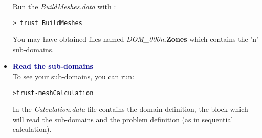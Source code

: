 \begin{itemize}
Run the \textit{BuildMeshes.data} with \trust:
\begin{verbatim}
> trust BuildMeshes
\end{verbatim}

You may have obtained files named \textit{DOM\_000n}\textbf{.Zones} which contains the 'n' sub-domains.\\



\item \textbf{\textcolor{darkblue}{Read the sub-domains}}\\
To see your sub-domains, you can run:
\begin{alltt} 
> trust -mesh Calculation
\end{alltt}

In the \textit{Calculation.data} file contains the domain definition, the block which will read the sub-domains and the problem definition (as in sequential calculation).
\begin{center}
\end{center}
\end{itemize}
